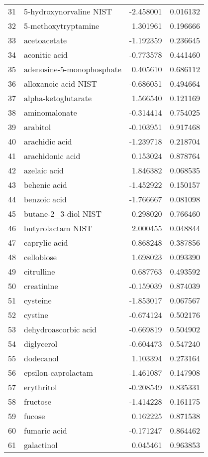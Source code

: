\begin{tabular}{llrr}
31 & 5-hydroxynorvaline NIST & -2.458001 & 0.016132 \\
32 & 5-methoxytryptamine & 1.301961 & 0.196666 \\
33 & acetoacetate & -1.192359 & 0.236645 \\
34 & aconitic acid & -0.773578 & 0.441460 \\
35 & adenosine-5-monophosphate & 0.405610 & 0.686112 \\
36 & alloxanoic acid NIST & -0.686051 & 0.494664 \\
37 & alpha-ketoglutarate & 1.566540 & 0.121169 \\
38 & aminomalonate & -0.314414 & 0.754025 \\
39 & arabitol & -0.103951 & 0.917468 \\
40 & arachidic acid & -1.239718 & 0.218704 \\
41 & arachidonic acid & 0.153024 & 0.878764 \\
42 & azelaic acid & 1.846382 & 0.068535 \\
43 & behenic acid & -1.452922 & 0.150157 \\
44 & benzoic acid & -1.766667 & 0.081098 \\
45 & butane-2_3-diol NIST & 0.298020 & 0.766460 \\
46 & butyrolactam NIST & 2.000455 & 0.048844 \\
47 & caprylic acid & 0.868248 & 0.387856 \\
48 & cellobiose & 1.698023 & 0.093390 \\
49 & citrulline & 0.687763 & 0.493592 \\
50 & creatinine & -0.159039 & 0.874039 \\
51 & cysteine & -1.853017 & 0.067567 \\
52 & cystine & -0.674124 & 0.502176 \\
53 & dehydroascorbic acid & -0.669819 & 0.504902 \\
54 & diglycerol & -0.604473 & 0.547240 \\
55 & dodecanol & 1.103394 & 0.273164 \\
56 & epsilon-caprolactam & -1.461087 & 0.147908 \\
57 & erythritol & -0.208549 & 0.835331 \\
58 & fructose & -1.414228 & 0.161175 \\
59 & fucose & 0.162225 & 0.871538 \\
60 & fumaric acid & -0.171247 & 0.864462 \\
61 & galactinol & 0.045461 & 0.963853 \\

\end{tabular}

